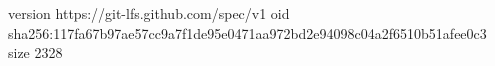 version https://git-lfs.github.com/spec/v1
oid sha256:117fa67b97ae57cc9a7f1de95e0471aa972bd2e94098c04a2f6510b51afee0c3
size 2328

